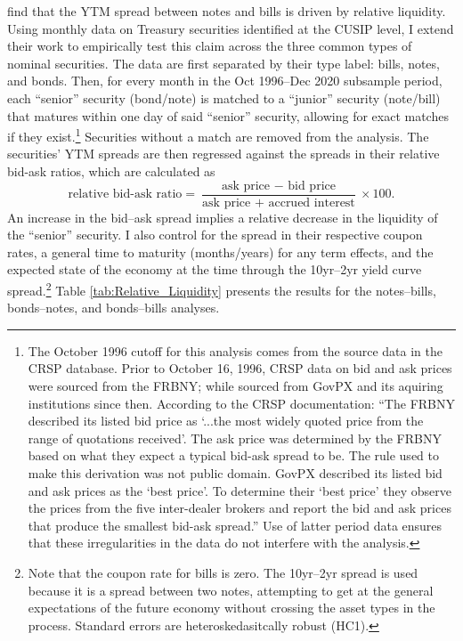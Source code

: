 \documentclass[11pt,a4paper,margin=1.5in]{article}
\begin{document}
\citet{Amihud-Mendelson:1991} find that the YTM spread between notes and bills is driven by relative liquidity.
Using monthly data on Treasury securities identified at the CUSIP level, I extend their work to empirically test this claim across the three common types of nominal securities.
The data are first separated by their type label: bills, notes, and bonds.
Then, for every month in the Oct 1996--Dec 2020 subsample period, each ``senior'' security (bond/note) is matched to a ``junior'' security (note/bill) that matures within one day of said ``senior'' security, allowing for exact matches if they exist.\footnote{
	The October 1996 cutoff for this analysis comes from the source data in the CRSP database. 
	Prior to October 16, 1996, CRSP data on bid and ask prices were sourced from the FRBNY; while sourced from GovPX and its aquiring institutions since then.
	According to the CRSP documentation: ``The FRBNY described its listed bid price as `...the most widely quoted price from the range of quotations received'. 
	The ask price was determined by the FRBNY based on what they expect a typical bid-ask spread to be. 
	The rule used to make this derivation was not public domain.
	GovPX described its listed bid and ask prices as the `best price'. To determine their `best price' they observe the prices from the five inter-dealer brokers and report the bid and ask prices that produce the smallest bid-ask spread.''
	Use of latter period data ensures that these irregularities in the data do not interfere with the analysis.
}
Securities without a match are removed from the analysis.
The securities' YTM spreads are then regressed against the spreads in their relative bid-ask ratios, which are calculated as 
$$ \text{relative bid-ask ratio} = \frac{\text{ask price }-\text{ bid price}}{\text{ask price }+\text{ accrued interest}}\times 100.$$
An increase in the bid--ask spread implies a relative decrease in the liquidity of the ``senior'' security.
I also control for the spread in their respective coupon rates, a general time to maturity (months/years) for any term effects, and the expected state of the economy at the time through the 10yr--2yr yield curve spread.\footnote{
	Note that the coupon rate for bills is zero.
	The 10yr--2yr spread is used because it is a spread between two notes, attempting to get at the general expectations of the future economy without crossing the asset types in the process. 
	Standard errors are heteroskedasitcally robust (HC1).
}
Table \ref{tab:Relative_Liquidity} presents the results for the notes--bills, bonds--notes, and bonds--bills analyses.
\end{document}
